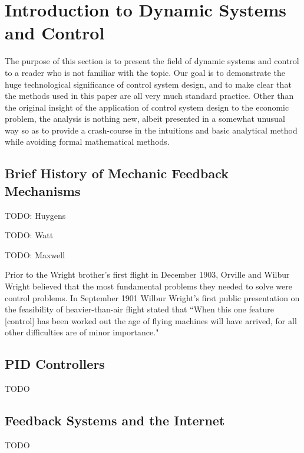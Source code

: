 \section{Introduction to Dynamic Systems and Control}
\label{section:dynamic_systems_and_control}

The purpose of this section is to present the field of dynamic systems and control to a reader who
is not familiar with the topic. Our goal is to demonstrate the huge technological significance of
control system design, and to make clear that the methods used in this paper are all very much
standard practice. Other than the original insight of the application of control system design to
the economic problem, the analysis is nothing new, albeit presented in a somewhat unusual way so as
to provide a crash-course in the intuitions and basic analytical method while avoiding formal
mathematical methods.

\subsection{Brief History of Mechanic Feedback Mechanisms}

TODO: Huygens

TODO: Watt

TODO: Maxwell

Prior to the Wright brother's first flight in December 1903, Orville and Wilbur Wright believed that
the most fundamental problems they needed to solve were control problems. In September 1901 Wilbur
Wright's first public presentation on the feasibility of heavier-than-air flight stated that ``When
this one feature [control] has been worked out the age of flying machines will have arrived, for all
other difficulties are of minor importance."\cite{wright1908}

\subsection{PID Controllers}

TODO

\subsection{Feedback Systems and the Internet}

TODO

